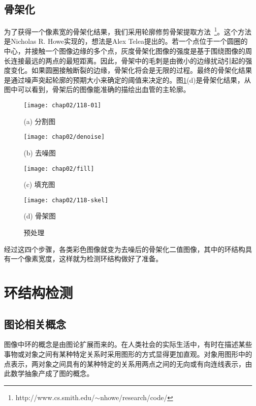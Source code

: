 \subsection{骨架化}
为了获得一个像素宽的骨架化结果，我们采用轮廓修剪骨架提取方法~\footnote{http://www.cs.smith.edu/$\sim$nhowe/research/code/}。这个方法是Nicholas R. Howe实现的，想法是Alex Telea提出的。若一个点位于一个圆圈的中心，并接触一个图像边缘的多个点，灰度骨架化图像的强度是基于围绕图像的周长连接最远的两点的最短距离。因此，骨架中的毛刺是由微小的边缘扰动引起的强度变化。如果圆圈接触断裂的边缘，骨架化将会是无限的过程。最终的骨架化结果是通过噪声突起轮廓的预期大小来确定的阈值来决定的。图\ref{fig:Preprocessing}(d)是骨架化结果，从图中可以看到，骨架后的图像能准确的描绘出血管的主轮廓。
\begin{figure}[H]
\centering
  \begin{minipage}[b]{0.48\textwidth}
    \centering
    \texttt{[image: chap02/118-01]}
      \centerline{(a) 分割图}\medskip
  \end{minipage}
  \begin{minipage}[b]{0.48\textwidth}
    \centering
    \texttt{[image: chap02/denoise]}
      \centerline{(b) 去噪图}\medskip
  \end{minipage}
  \begin{minipage}[b]{0.48\textwidth}
    \centering
    \texttt{[image: chap02/fill]}
      \centerline{(c) 填充图}\medskip
  \end{minipage}
  \begin{minipage}[b]{0.48\textwidth}
    \centering
    \texttt{[image: chap02/118-skel]}
      \centerline{(d) 骨架图}\medskip
  \end{minipage}
\caption{预处理}
\label{fig:Preprocessing}
\end{figure}

经过这四个步骤，各类彩色图像就变为去噪后的骨架化二值图像，其中的环结构具有一个像素宽度，这样就为检测环结构做好了准备。

\section{环结构检测}
\label{}
\subsection{图论相关概念}
\label{}

图像中环的概念是由图论扩展而来的。在人类社会的实际生活中，有时在描述某些事物或对象之间有某种特定关系时采用图形的方式显得更加直观。对象用图形中的点表示，两对象之间具有的某种特定的关系用两点之间的无向或有向连线表示，由此数学抽象产成了图的概念。

